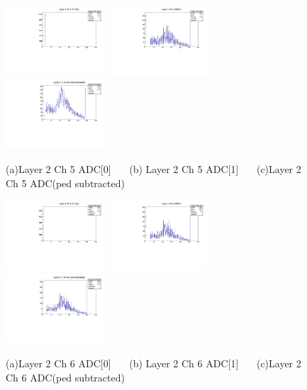 \documentclass[a4paper,11pt]{article}
\theoremstyle{mytheor}
\begin{document}
\begin{figure}[H] 
\vspace*{-0.3cm} 
\includegraphics[width=0.33\textwidth,scale=0.5,trim=0 0 0 0,clip]{plotsdir/file0_muons-Layer2_Ch5_adc0-1.pdf} 
\includegraphics[width=0.33\textwidth,scale=0.5,trim=0 0 0 0,clip]{plotsdir/file0_muons-Layer2_Ch5_adc1-1.pdf} 
\includegraphics[width=0.33\textwidth,scale=0.5,trim=0 0 0 0,clip]{plotsdir/file0_muons-Layer2_Ch5_adcPedsub-1.pdf} 
\caption{(a)Layer 2 Ch 5 ADC[0] ~~~(b) Layer 2 Ch 5 ADC[1] ~~~(c)Layer 2 Ch 5 ADC(ped subtracted) } 
\end{figure} 
\begin{figure}[H] 
\vspace*{-0.3cm} 
\includegraphics[width=0.33\textwidth,scale=0.5,trim=0 0 0 0,clip]{plotsdir/file0_muons-Layer2_Ch6_adc0-1.pdf} 
\includegraphics[width=0.33\textwidth,scale=0.5,trim=0 0 0 0,clip]{plotsdir/file0_muons-Layer2_Ch6_adc1-1.pdf} 
\includegraphics[width=0.33\textwidth,scale=0.5,trim=0 0 0 0,clip]{plotsdir/file0_muons-Layer2_Ch6_adcPedsub-1.pdf} 
\caption{(a)Layer 2 Ch 6 ADC[0] ~~~(b) Layer 2 Ch 6 ADC[1] ~~~(c)Layer 2 Ch 6 ADC(ped subtracted) } 
\end{figure} 
\end{document}
